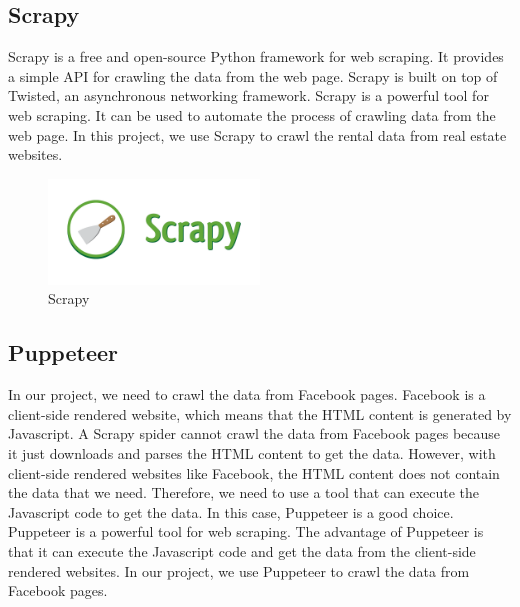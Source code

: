 \subsection{Scrapy}
Scrapy is a free and open-source Python framework for web scraping. It provides a simple API for crawling the data from the web page. Scrapy is built on top of Twisted, an asynchronous networking framework. Scrapy is a powerful tool for web scraping. It can be used to automate the process of crawling data from the web page. In this project, we use Scrapy to crawl the rental data from real estate websites.
\begin{figure}[ht]
    \centering
    \includegraphics[width=0.5\textwidth]{../Images/8.Technology_Stack/scrapy.png}
    \caption{Scrapy}
    \label{fig:scrapy}
\end{figure}

\subsection{Puppeteer}
In our project, we need to crawl the data from Facebook pages. Facebook is a client-side rendered website, which means that the HTML content is generated by Javascript. A Scrapy spider cannot crawl the data from Facebook pages because it just downloads and parses the HTML content to get the data. However, with client-side rendered websites like Facebook, the HTML content does not contain the data that we need. Therefore, we need to use a tool that can execute the Javascript code to get the data. In this case, Puppeteer is a good choice. Puppeteer is a powerful tool for web scraping. The advantage of Puppeteer is that it can execute the Javascript code and get the data from the client-side rendered websites. In our project, we use Puppeteer to crawl the data from Facebook pages.

